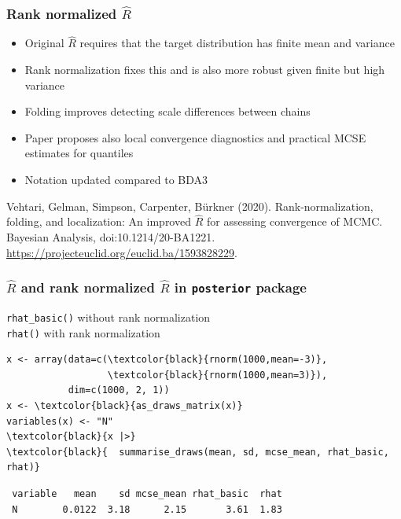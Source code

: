 \documentclass[finnish,english,t]{beamer}
\begin{document}
\begin{frame}[fragile]
  \frametitle{Rank normalized $\widehat{R}$}

  \begin{itemize}
  \item<+-> Original $\widehat{R}$ requires that the target distribution
    has finite mean and variance
  \item<+-> Rank normalization fixes this and is also more robust given
    finite but high variance
  \item<+-> Folding improves detecting scale differences between chains
  \item<+-> Paper proposes also local convergence diagnostics and
    practical MCSE estimates for quantiles
  \item<+-> Notation updated compared to BDA3 
  \end{itemize}  

  \vfill
  {\small\color{gray}
    Vehtari, Gelman, Simpson, Carpenter, Bürkner
  (2020). Rank-normalization, folding, and localization: An improved
  $\widehat{R}$ for assessing convergence of MCMC. Bayesian Analysis, doi:10.1214/20-BA1221. \url{https://projecteuclid.org/euclid.ba/1593828229}.}

\end{frame}

\begin{frame}[fragile]
  \frametitle{ $\widehat{R}$ and rank normalized $\widehat{R}$ in \texttt{posterior} package}

\texttt{rhat\_basic()} without rank normalization\\
\texttt{rhat()} with rank normalization
\pause
{\small
  {\color{gray}
\begin{Verbatim}[commandchars=\\\{\}]
x <- array(data=c(\textcolor{black}{rnorm(1000,mean=-3)},
                  \textcolor{black}{rnorm(1000,mean=3)}),
           dim=c(1000, 2, 1))
x <- \textcolor{black}{as_draws_matrix(x)}
variables(x) <- "N"
\textcolor{black}{x |>}
\textcolor{black}{  summarise_draws(mean, sd, mcse_mean, rhat_basic, rhat)}
\end{Verbatim}
}
\pause
\begin{Verbatim}
 variable   mean    sd mcse_mean rhat_basic  rhat
 N        0.0122  3.18      2.15       3.61  1.83
\end{Verbatim}
}

\end{frame}
\end{document}
